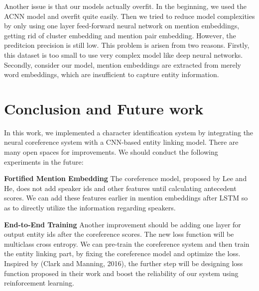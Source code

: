 \documentclass[11pt]{article}
\begin{document}
Another issue is that our models actually overfit. In the beginning, we used the ACNN model and overfit quite easily. Then we tried to reduce model complexities by only using one layer feed-forward neural network on mention embeddings, getting rid of cluster embedding and mention pair embedding. However, the preditcion precision is still low. This problem is arisen from two reasons. Firstly, this dataset is too small to use very complex model like deep neural networks. Secondly, consider our model, mention embeddings are extracted from merely word embeddings, which are insufficient to capture entity information.

\section{Conclusion and Future work}

In this work, we implemented a character identification system by integrating the neural coreference system with a CNN-based entity linking model. There are many open spaces for improvements. We should conduct the following experiments in the future:

{\bf Fortified Mention Embedding} 
The coreference model, proposed by Lee and He, does not add speaker ids and other features until calculating antecedent scores. We can add these features earlier in mention embeddings after LSTM so as to directly utilize the information regarding speakers.   

{\bf End-to-End Training}
Another improvement should be adding one layer for output entity ids after the coreference scores. The new loss function will be multiclass cross entropy. We can pre-train the coreference system and then train the entity linking part, by fixing the coreference model and optimize the loss. Inspired by (Clark and Manning, 2016), the further step will be designing loss function proposed in their work and boost the reliability of our system using reinforcement learning.



%
%



\appendix
\end{document}
